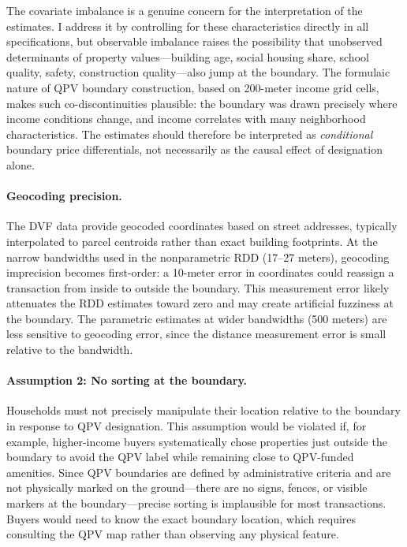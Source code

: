 \documentclass[12pt]{article}
\begin{document}
The covariate imbalance is a genuine concern for the interpretation of the estimates. I address it by controlling for these characteristics directly in all specifications, but observable imbalance raises the possibility that unobserved determinants of property values---building age, social housing share, school quality, safety, construction quality---also jump at the boundary. The formulaic nature of QPV boundary construction, based on 200-meter income grid cells, makes such co-discontinuities plausible: the boundary was drawn precisely where income conditions change, and income correlates with many neighborhood characteristics. The estimates should therefore be interpreted as \textit{conditional} boundary price differentials, not necessarily as the causal effect of designation alone.

\paragraph{Geocoding precision.} The DVF data provide geocoded coordinates based on street addresses, typically interpolated to parcel centroids rather than exact building footprints. At the narrow bandwidths used in the nonparametric RDD (17--27 meters), geocoding imprecision becomes first-order: a 10-meter error in coordinates could reassign a transaction from inside to outside the boundary. This measurement error likely attenuates the RDD estimates toward zero and may create artificial fuzziness at the boundary. The parametric estimates at wider bandwidths (500 meters) are less sensitive to geocoding error, since the distance measurement error is small relative to the bandwidth.

\paragraph{Assumption 2: No sorting at the boundary.} Households must not precisely manipulate their location relative to the boundary in response to QPV designation. This assumption would be violated if, for example, higher-income buyers systematically chose properties just outside the boundary to avoid the QPV label while remaining close to QPV-funded amenities. Since QPV boundaries are defined by administrative criteria and are not physically marked on the ground---there are no signs, fences, or visible markers at the boundary---precise sorting is implausible for most transactions. Buyers would need to know the exact boundary location, which requires consulting the QPV map rather than observing any physical feature.
\end{document}
